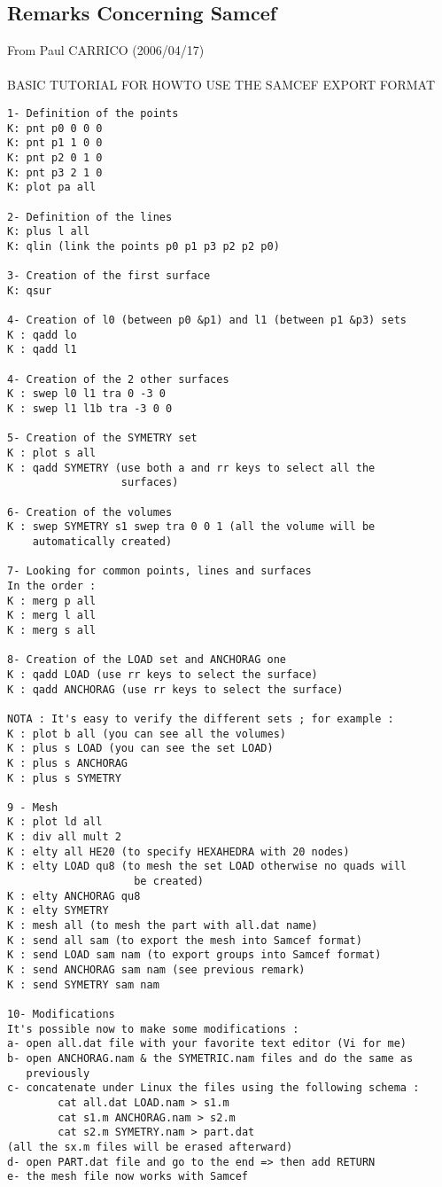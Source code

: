 \documentclass{article}
\begin{document}
\begin{appendix}
\subsection{\label{Remarks Concerning Samcef}Remarks Concerning Samcef}
From Paul CARRICO (2006/04/17)\\\\
BASIC TUTORIAL FOR HOWTO USE THE SAMCEF EXPORT FORMAT

\begin{verbatim}
1- Definition of the points
K: pnt p0 0 0 0 
K: pnt p1 1 0 0
K: pnt p2 0 1 0
K: pnt p3 2 1 0
K: plot pa all 

2- Definition of the lines
K: plus l all
K: qlin (link the points p0 p1 p3 p2 p2 p0)

3- Creation of the first surface
K: qsur

4- Creation of l0 (between p0 &p1) and l1 (between p1 &p3) sets
K : qadd lo 
K : qadd l1

4- Creation of the 2 other surfaces
K : swep l0 l1 tra 0 -3 0
K : swep l1 l1b tra -3 0 0

5- Creation of the SYMETRY set
K : plot s all 
K : qadd SYMETRY (use both a and rr keys to select all the
                  surfaces)

6- Creation of the volumes
K : swep SYMETRY s1 swep tra 0 0 1 (all the volume will be 
    automatically created)

7- Looking for common points, lines and surfaces
In the order :
K : merg p all
K : merg l all
K : merg s all

8- Creation of the LOAD set and ANCHORAG one
K : qadd LOAD (use rr keys to select the surface)
K : qadd ANCHORAG (use rr keys to select the surface)

NOTA : It's easy to verify the different sets ; for example :
K : plot b all (you can see all the volumes)
K : plus s LOAD (you can see the set LOAD)
K : plus s ANCHORAG
K : plus s SYMETRY 

9 - Mesh
K : plot ld all 
K : div all mult 2 
K : elty all HE20 (to specify HEXAHEDRA with 20 nodes)
K : elty LOAD qu8 (to mesh the set LOAD otherwise no quads will
                    be created)
K : elty ANCHORAG qu8 
K : elty SYMETRY
K : mesh all (to mesh the part with all.dat name)
K : send all sam (to export the mesh into Samcef format)
K : send LOAD sam nam (to export groups into Samcef format)
K : send ANCHORAG sam nam (see previous remark)
K : send SYMETRY sam nam

10- Modifications
It's possible now to make some modifications :
a- open all.dat file with your favorite text editor (Vi for me)
b- open ANCHORAG.nam & the SYMETRIC.nam files and do the same as
   previously
c- concatenate under Linux the files using the following schema :
        cat all.dat LOAD.nam > s1.m
        cat s1.m ANCHORAG.nam > s2.m
        cat s2.m SYMETRY.nam > part.dat
(all the sx.m files will be erased afterward)
d- open PART.dat file and go to the end => then add RETURN
e- the mesh file now works with Samcef



\end{verbatim}
\end{appendix}
\end{document}
